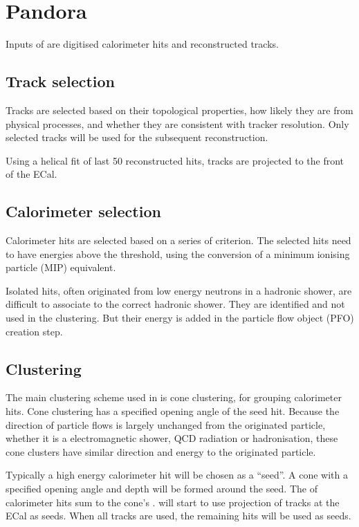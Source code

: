 \section{Pandora}

Inputs of \pandora are digitised calorimeter hits and reconstructed tracks.

\subsection{Track selection}

Tracks are selected based on their topological properties, how likely they are from physical processes, and whether they are consistent with tracker resolution. Only selected tracks will be used for the subsequent reconstruction.

Using a helical fit of last 50 reconstructed hits, tracks are projected to the front of the ECal.

\subsection{Calorimeter selection}

Calorimeter hits are selected based on a series of criterion. The selected hits need to have energies above the threshold, using the conversion of a minimum ionising particle (MIP) equivalent.

Isolated hits, often originated from low energy neutrons in a hadronic shower, are difficult to associate to the correct hadronic shower. They are identified and not used in the clustering. But their energy is added in the particle flow object (PFO) creation step.

\subsection{Clustering}
\label{sec:pandoraConeClustering}

The main clustering scheme used in \pandora is cone clustering, for grouping calorimeter hits.
Cone clustering has a specified opening angle of the seed hit. Because the direction of particle flows is largely unchanged from the originated particle, whether it is a electromagnetic shower, QCD radiation or hadronisation, these cone clusters have similar direction and energy to the originated particle.

Typically a high energy calorimeter hit will be chosen as a ``seed''. A cone with a specified opening angle and depth will be formed around the seed. The \fourMomentum of calorimeter hits sum to the cone's \fourMomentum. \pandora will start to use projection of tracks at the ECal as seeds. When all tracks are used, the remaining hits will be used as seeds.

